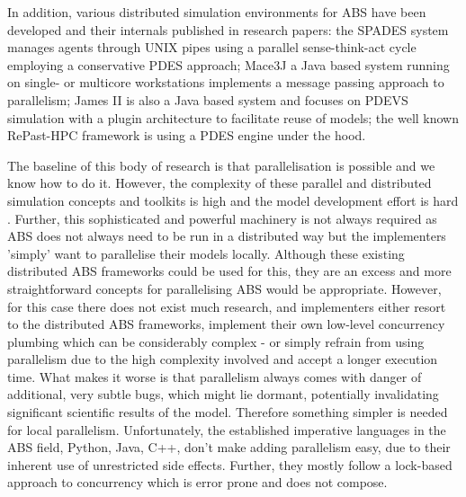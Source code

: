 In addition, various distributed simulation environments for ABS have been developed and their internals published in research papers: the SPADES system \cite{riley_next_2003} manages agents through UNIX pipes using a parallel sense-think-act cycle employing a conservative PDES approach; Mace3J \cite{gasser_mace3j:_2002} a Java based system running on single- or multicore workstations implements a message passing approach to parallelism; James II \cite{himmelspach_plugn_2007} is also a Java based system and focuses on PDEVS simulation with a plugin architecture to facilitate reuse of models; the well known RePast-HPC \cite{minson_distributing_2008, gorur_repast_2016} framework is using a PDES engine under the hood. 

The baseline of this body of research is that parallelisation is possible and we know how to do it. However, the complexity of these parallel and distributed simulation concepts and toolkits is high and the model development effort is hard \cite{abar_agent_2017}. Further, this sophisticated and powerful machinery is not always required as ABS does not always need to be run in a distributed way but the implementers 'simply' want to parallelise their models locally. Although these existing distributed ABS frameworks could be used for this, they are an excess and more straightforward concepts for parallelising ABS would be appropriate. However, for this case there does not exist much research, and implementers either resort to the distributed ABS frameworks, implement their own low-level concurrency plumbing which can be considerably complex - or simply refrain from using parallelism due to the high complexity involved and accept a longer execution time. What makes it worse is that parallelism always comes with danger of additional, very subtle bugs, which might lie dormant, potentially invalidating significant scientific results of the model. Therefore something simpler is needed for local parallelism. Unfortunately, the established imperative languages in the ABS field, Python, Java, C++, don't make adding parallelism easy, due to their inherent use of unrestricted side effects. Further, they mostly follow a lock-based approach to concurrency which is error prone and does not compose. %

\medskip

